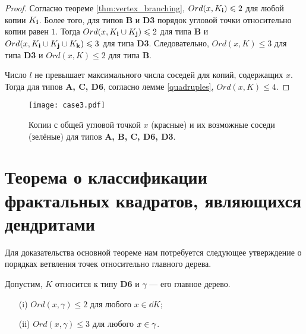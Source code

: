 \begin{proof}
Согласно теореме \ref{thm:vertex_branching}, $Ord(x,K_{\bf{i}})\leqslant2$ для любой копии $K_{\bf{i}}$.
Более того, для типов \textbf{B} и \textbf{D3} порядок угловой точки относительно копии равен $1$.
Тогда $Ord(x,K_{\bf{i}}\cup K_{\bf{j}})\leqslant2$ для типа \textbf{B} и $Ord(x,K_{\bf{i}}\cup K_{\bf{j}}\cup K_{\bf{k}})\leqslant3$ для типа \textbf{D3}.
Следовательно, $Ord(x,K)\leq3$ для типа {\bf D3} и $Ord(x,K)\leq2$ для типа {\bf B}.

Число $l$ не превышает максимального числа соседей для копий, содержащих $x$.
Тогда для типов {\bf A, C, D6}, согласно лемме \ref{quadruples}, $Ord(x,K)\leq4$.
\end{proof}

\begin{figure}[H]
\centering
\texttt{[image: case3.pdf]}
\caption{Копии с общей угловой точкой $x$ (красные) и их возможные соседи (зелёные) для типов {\bf A, B, C, D6, D3}.}
\label{fig:case3}
\end{figure}


\section{Теорема о классификации фрактальных квадратов, являющихся дендритами}

Для доказательства основной теореме нам потребуется следующее утверждение о порядках ветвления точек относительно главного дерева.

\begin{proposition}\label{lem:d4bound}
Допустим, $K$ относится к типу {\bf D6} и $\gamma$ --- его главное дерево.
\begin{itemize}[nolistsep]
    \item[(i)] $Ord(x,\gamma)\leq2$ для любого $x\in\dd K$;
    \item[(ii)] $Ord(x,\gamma)\leq3$ для любого $x\in\gamma$.
\end{itemize}
\end{proposition}



